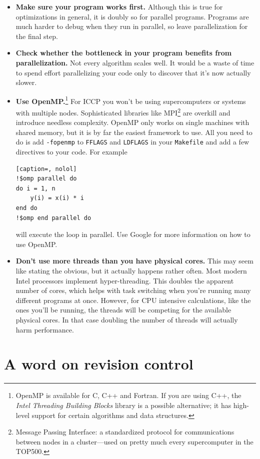 \documentclass[openany,oneside]{report}
\begin{document}
\begin{itemize}
  \item\textbf{Make sure your program works first.} Although this is true for optimizations in general, it is doubly so for parallel programs.
    Programs are much harder to debug when they run in parallel, so leave parallelization for the final step.
  \item\textbf{Check whether the bottleneck in your program benefits from parallelization.} Not every algorithm scales well.
    It would be a waste of time to spend effort parallelizing your code only to discover that it's now actually slower.
  \item\textbf{Use OpenMP.}\footnote{OpenMP is available for C, C++ and Fortran.
    If you are using C++, the \emph{Intel Threading Building Blocks} library is a possible alternative; it has high-level support for certain algorithms and data structures.} For ICCP you won't be using supercomputers or systems with multiple nodes.
    Sophisticated libraries like MPI\footnote{Message Passing Interface: a standardized protocol for communications between nodes in a cluster---used on pretty much every supercomputer in the TOP500.} are overkill and introduce needless complexity.
    OpenMP only works on single machines with shared memory, but it is by far the easiest framework to use.
    All you need to do is add \texttt{-fopenmp} to \texttt{FFLAGS} and \texttt{LDFLAGS} in your \texttt{Makefile} and add a few directives to your code.
    For example
\begin{lstlisting}[caption=, nolol]
!$omp parallel do
do i = 1, n
    y(i) = x(i) * i
end do
!$omp end parallel do
\end{lstlisting}
    will execute the loop in parallel. Use Google for more information on how to use OpenMP.
  \item\textbf{Don't use more threads than you have physical cores.} This may seem like stating the obvious, but it actually happens rather often.
  Most modern Intel processors implement hyper-threading.
  This doubles the apparent number of cores, which helps with task switching when you're running many different programs at once.
  However, for CPU intensive calculations, like the ones you'll be running, the threads will be competing for the available physical cores.
  In that case doubling the number of threads will actually harm performance.
\end{itemize}

\chapter[Revision control]{A word on revision control}
\label{chap:Revision control}
\end{document}
